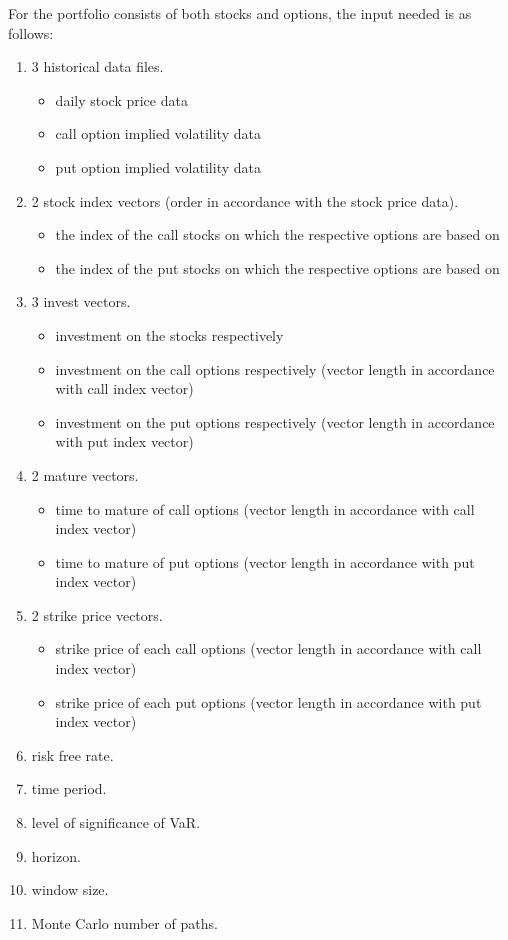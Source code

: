 \documentclass[letterpaper,11pt, oneside]{layout}
\begin{document}
For the portfolio consists of both stocks and options, the input needed is as follows:
\begin{enumerate}
\item 3 historical data files.
\begin{itemize}
\item daily stock price data
\item call option implied volatility data
\item put option implied volatility data
\end{itemize}
\item 2 stock index vectors (order in accordance with the stock price data).
	\begin{itemize}
	\item the index of the call stocks on which the respective options are based on
	\item the index of the put stocks on which the respective options are based on
	\end{itemize}
\item 3 invest vectors.
	\begin{itemize}
	\item investment on the stocks respectively
	\item investment on the call options respectively (vector length in accordance with call index vector)
	\item investment on the put options respectively (vector length in accordance with put index vector)
	\end{itemize}
\item 2 mature vectors.
	\begin{itemize}
	\item time to mature of call options (vector length in accordance with call index vector)
	\item time to mature of put options (vector length in accordance with put index vector)
	\end{itemize}
\item 2 strike price vectors.
	\begin{itemize}
	\item strike price of each call options (vector length in accordance with call index vector)
	\item strike price of each put options (vector length in accordance with put index vector)
	\end{itemize}
\item risk free rate.
\item time period.
\item level of significance of VaR.
\item horizon.
\item window size.
\item Monte Carlo number of paths.
\end{enumerate}
	
\end{document}
